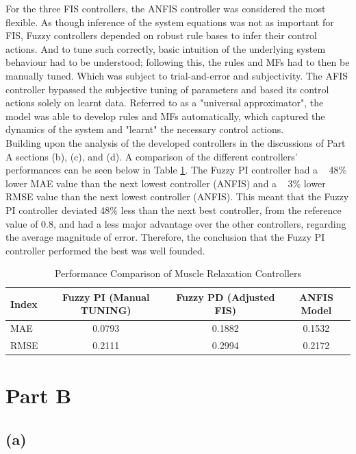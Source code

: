 \documentclass[12pt]{article}
\begin{document}
For the three FIS controllers, the ANFIS controller was considered the most flexible.
As though inference of the system equations was not as important for FIS, Fuzzy controllers depended on robust rule bases to infer their control actions.
And to tune such correctly, basic intuition of the underlying system behaviour had to be understood; following this, the rules and MFs had to then be manually tuned.
Which was subject to trial-and-error and subjectivity.
The AFIS controller bypassed the subjective tuning of parameters and based its control actions solely on learnt data.
Referred to as a "universal approximator", the model was able to develop rules and MFs automatically, which captured the dynamics of the system and "learnt" the necessary control actions.
\\

Building upon the analysis of the developed controllers in the discussions of Part A sections (b), (c), and (d). 
A comparison of the different controllers' performances can be seen below in Table \ref{tab:controller_performance}.
The Fuzzy PI controller had a ~ 48\% lower MAE value than the next lowest controller (ANFIS) and  a ~ 3\% lower RMSE value than the next lowest controller (ANFIS).
This meant that the Fuzzy PI controller deviated 48\% less than the next best controller, from the reference value of 0.8, and had a less major advantage over the other controllers, regarding the average magnitude of error.
Therefore, the conclusion that the Fuzzy PI controller performed the best was well founded. 

\begin{table}[H]
\centering
\begin{tabular}{|l|c|c|c|}
\hline
\textbf{Index} & \textbf{Fuzzy PI (Manual TUNING)} & \textbf{Fuzzy PD (Adjusted FIS)} & \textbf{ANFIS Model} \\ \hline
MAE & 0.0793 & 0.1882 & 0.1532 \\ \hline
RMSE & 0.2111 & 0.2994 & 0.2172 \\ \hline
\end{tabular}
\caption{Performance Comparison of Muscle Relaxation Controllers}
\label{tab:controller_performance}
\end{table}

\section{Part B}

\subsection{(a)}
\end{document}
